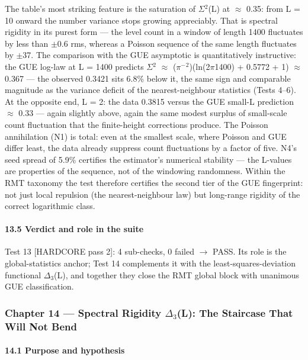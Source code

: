 \documentclass[10pt]{article}
\begin{document}
The table's most striking feature is the saturation of $\Sigma$$^2$(L) at $\approx$ 0.35: from L = 10 onward the number variance stops growing appreciably. That is spectral rigidity in its purest form --- the level count in a window of length 1400 fluctuates by less than $\pm$0.6 rms, whereas a Poisson sequence of the same length fluctuates by $\pm$37. The comparison with the GUE asymptotic is quantitatively instructive: the GUE log-law at L = 1400 predicts $\Sigma$$^2$ $\approx$ ($\pi$$^-$$^2$)(ln(2$\pi$\textperiodcentered{}1400) + 0.5772 + 1) $\approx$ 0.367 --- the observed 0.3421 sits 6.8\% below it, the same sign and comparable magnitude as the variance deficit of the nearest-neighbour statistics (Tests 4--6). At the opposite end, L = 2: the data 0.3815 versus the GUE small-L prediction $\approx$ 0.33 --- again slightly above, again the same modest surplus of small-scale count fluctuation that the finite-height corrections produce. The Poisson annihilation (N1) is total: even at the smallest scale, where Poisson and GUE differ least, the data already suppress count fluctuations by a factor of five. N4's seed spread of 5.9\% certifies the estimator's numerical stability --- the L-values are properties of the sequence, not of the windowing randomness. Within the RMT taxonomy the test therefore certifies the second tier of the GUE fingerprint: not just local repulsion (the nearest-neighbour law) but long-range rigidity of the correct logarithmic class.

\paragraph{13.5 Verdict and role in the suite}

Test 13 [HARDCORE pass 2]: 4 sub-checks, 0 failed $\rightarrow$ PASS. Its role is the global-statistics anchor; Test 14 complements it with the least-squares-deviation functional $\Delta$$_3$(L), and together they close the RMT global block with unanimous GUE classification.

\subsubsection{Chapter 14 --- Spectral Rigidity $\Delta$$_3$(L): The Staircase That Will Not Bend}

\paragraph{14.1 Purpose and hypothesis}
\end{document}
